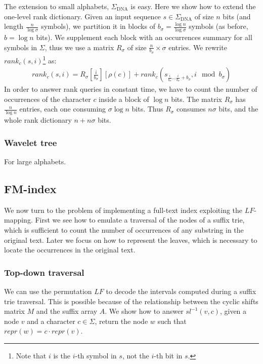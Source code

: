 The extension to small alphabets, \eg $\Sigma_{\text{DNA}}$ is easy.
Here we show how to extend the one-level rank dictionary.
Given an input sequence $s \in \Sigma_{\text{DNA}}$ of size $n$ bits (and length $\frac{n}{\log{\sigma}}$ symbols), we partition it in blocks of $b_{\sigma}=\frac{\log{n}}{\log{\sigma}}$ symbols (as before, $b=\log{n}$ bits).
We supplement each block with an occurrences summary for all symbols in $\Sigma$, thus we use a matrix $R_{\sigma}$ of size $\frac{n}{b_{\sigma}} \times \sigma$ entries.
We rewrite $rank_c(s,i)$\footnote{Note that $i$ is the $i$-th symbol in $s$, not the $i$-th bit in $s$.} as:
\begin{eqnarray}
rank_c(s,i) = R_{\sigma}[\frac{i}{b_{\sigma}}][\rho(c)] + rank_c(s_{\frac{i}{b_{\sigma}} \dots \frac{i}{b_{\sigma}}+b_{\sigma}}, i \mod{b_{\sigma}})
\end{eqnarray}
In order to answer rank queries in constant time, we have to count the number of occurrences of the character $c$ inside a block of $\log{n}$ bits.
The matrix $R_{\sigma}$ has $\frac{n}{\log{n}}$ entries, each one consuming $\sigma \log{n}$ bits. Thus $R_{\sigma}$ consumes $n \sigma$ bits, and the whole rank dictionary $n + n \sigma$ bits.

\subsubsection{Wavelet tree}

For large alphabets.

\subsection{FM-index}

We now turn to the problem of implementing a full-text index exploiting the $LF$-mapping.
First we see how to emulate a traversal of the nodes of a suffix trie, which is sufficient to count the number of occurrences of any substring in the original text.
Later we focus on how to represent the leaves, which is necessary to locate the occurrences in the original text.

\label{sub:fmi}
\subsubsection{Top-down traversal}

We can use the permutation $LF$ to decode the intervals computed during a suffix trie traversal.
This is possible because of the relationship between the cyclic shifts matrix $M$ and the suffix array $A$.
We show how to answer $sl^{-1}(v,c)$, \ie given a node $v$ and a character $c \in \Sigma$, return the node $w$ such that $repr(w) = c \cdot repr(v)$.

